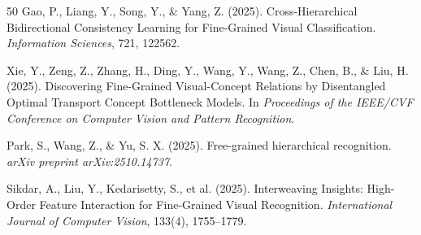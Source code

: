 \documentclass[pdflatex,sn-mathphys-num]{sn-jnl}
\theoremstyle{thmstyleone}%
\theoremstyle{thmstyletwo}%
\theoremstyle{thmstylethree}%
\begin{document}
\begin{thebibliography}{50}
     Gao, P., Liang, Y., Song, Y., \& Yang, Z. (2025). Cross-Hierarchical Bidirectional Consistency Learning for Fine-Grained Visual Classification. \textit{Information Sciences}, 721, 122562.
    
     Xie, Y., Zeng, Z., Zhang, H., Ding, Y., Wang, Y., Wang, Z., Chen, B., \& Liu, H. (2025). Discovering Fine-Grained Visual-Concept Relations by Disentangled Optimal Transport Concept Bottleneck Models. In \textit{Proceedings of the IEEE/CVF Conference on Computer Vision and Pattern Recognition}.
    
     Park, S., Wang, Z., \& Yu, S. X. (2025). Free-grained hierarchical recognition. \textit{arXiv preprint arXiv:2510.14737}.
    
     Sikdar, A., Liu, Y., Kedarisetty, S., et al. (2025). Interweaving Insights: High-Order Feature Interaction for Fine-Grained Visual Recognition. \textit{International Journal of Computer Vision}, 133(4), 1755--1779.
    
\end{thebibliography}
\end{document}
